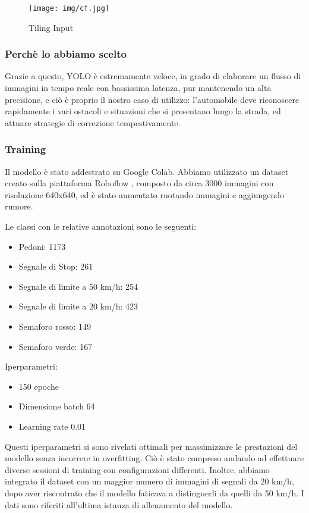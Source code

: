 \documentclass{article}
\begin{document}
\begin{figure}[h!]
    \centering
    \texttt{[image: img/cf.jpg]}
    \caption{Tiling Input}
\end{figure}

\subsubsection{Perchè lo abbiamo scelto}
Grazie a questo, YOLO è estremamente veloce, in grado di elaborare un flusso di immagini in tempo reale con bassissima latenza, pur mantenendo un alta precisione, e ciò è proprio il nostro caso di utilizzo: l'automobile deve riconoscere rapidamente i vari ostacoli e situazioni che si presentano lungo la strada, ed attuare strategie di correzione tempestivamente.

\subsubsection{Training}

  Il modello è stato addestrato su Google Colab.
  Abbiamo utilizzato un dataset creato sulla piattaforma Roboflow \cite{dataset}, composto da circa 3000 immagini con risoluzione 640x640, ed è stato aumentato ruotando immagini e aggiungendo rumore.
  
  Le classi con le relative annotazioni sono le seguenti:
  \begin{itemize}
    \item Pedoni: 1173
    \item Segnale di Stop: 261
    \item Segnale di limite a 50 km/h: 254
    \item Segnale di limite a 20 km/h: 423
    \item Semaforo rosso: 149
    \item Semaforo verde: 167
  \end{itemize}
  
  Iperparametri:
  \begin{itemize}
    \item 150 epoche
    \item Dimensione batch 64
    \item Learning rate 0.01
  \end{itemize}

  Questi iperparametri si sono rivelati ottimali per massimizzare le prestazioni del modello senza incorrere in overfitting. Ciò è stato compreso andando ad effettuare diverse sessioni di training con configurazioni differenti.
  Inoltre, abbiamo integrato il dataset con un maggior numero di immagini di segnali da 20 km/h, dopo aver riscontrato che il modello faticava a distinguerli da quelli da 50 km/h.
  I dati sono riferiti all'ultima istanza di allenamento del modello.
\end{document}
